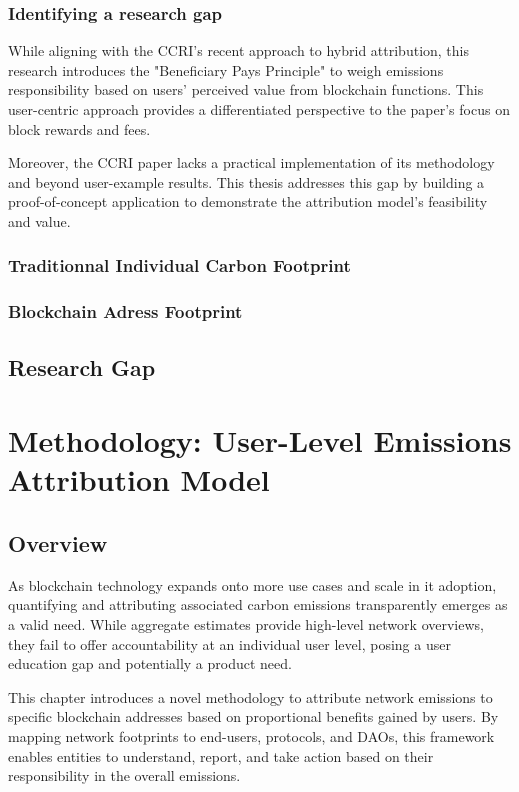 \documentclass[11pt]{report}
\begin{document}
\subsection{Identifying a research gap}

While aligning with the CCRI's recent approach to hybrid attribution, this research introduces the "Beneficiary Pays Principle" to weigh emissions responsibility based on users' perceived value from blockchain functions. This user-centric approach provides a differentiated perspective to the paper's focus on block rewards and fees.

Moreover, the CCRI paper lacks a practical implementation of its methodology and beyond user-example results. This thesis addresses this gap by building a proof-of-concept application to demonstrate the attribution model's feasibility and value.

\subsection{Traditionnal Individual Carbon Footprint}
\subsection{Blockchain Adress Footprint}
\section{Research Gap}


\chapter{Methodology: User-Level Emissions Attribution Model}
\section{Overview}


As blockchain technology expands onto more use cases and scale in it adoption, quantifying and attributing associated carbon emissions transparently emerges as a valid need. While aggregate estimates provide high-level network overviews, they fail to offer accountability at an individual user level, posing a user education gap and potentially a product need.

This chapter introduces a novel methodology to attribute network emissions to specific blockchain addresses based on proportional benefits gained by users. By mapping network footprints to end-users, protocols, and DAOs, this framework enables entities to understand, report, and take action based on their responsibility in the overall emissions.
\end{document}
